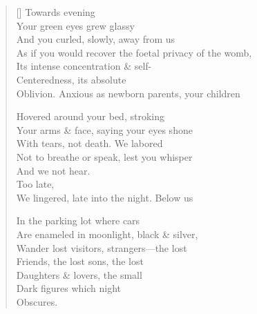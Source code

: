 \label{ch:nightfall}
\settowidth{\versewidth}{Oblivion. \qquad Anxious as newborn parents, your children}
\begin{verse}[\versewidth]
Towards evening\\
Your green eyes grew glassy\\
And you curled, slowly, away from us\\
As if you would recover the foetal privacy of the womb,\\
Its intense concentration \& self-\\
Centeredness, its absolute\\
Oblivion. \qquad Anxious as newborn parents, your children

Hovered around your bed, stroking\\
Your arms \& face, saying your eyes shone\\
With tears, not death. We labored\\
Not to breathe or speak, lest you whisper\\
And we not hear.\\
\hfill Too late,\\
We lingered, late into the night. Below us

In the parking lot where cars\\
Are enameled in moonlight, black \& silver,\\
Wander lost visitors, strangers---the lost\\
Friends, the lost sons, the lost\\
Daughters \& lovers, the small\\
Dark figures which night\\
Obscures.
\end{verse}
